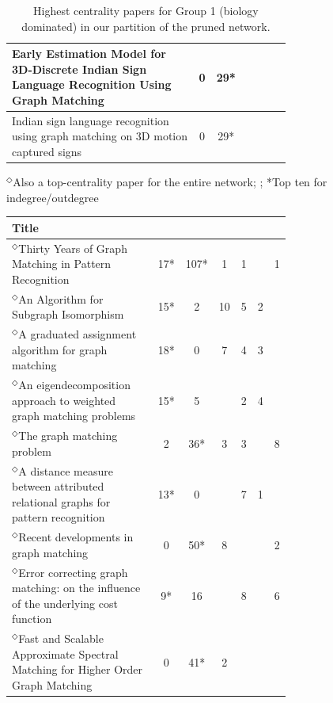 \documentclass[12pt]{thesis}
\theoremstyle{plain}
\theoremstyle{definition}
\theoremstyle{remark}
\begin{document}
\begin{table}[H]
{\begin{tabular}{|L{0.7\linewidth}|c|c|c|c|c|c|}
Early Estimation Model for 3D-Discrete Indian Sign Language Recognition Using Graph Matching  \cite{Kumar_2018a} & 0 & 29* &  &  &  &  \\ \hline
Indian sign language recognition using graph matching on 3D motion captured signs  \cite{Kumar_2018b} & 0 & 29* &  &  &  &  \\ \hline
\end{tabular}
\singlespacing
$^\Diamond$Also a top-centrality paper for the entire network; ; *Top ten for indegree/outdegree}
\caption{Highest centrality papers for Group 1 (biology dominated) in our partition of the pruned network.}
\label{tab:toppapers_bio}
\end{table}

\begin{table}[H]
{\fontsize{10}{13}\selectfont
\begin{tabular}{|L{0.7\linewidth}|c|c|c|c|c|c|}
\hline
Title &  &   &  &   &   &  \\ \hline\hline
$^\Diamond$Thirty Years of Graph Matching in Pattern Recognition  \cite{Conte_2004} & 17* & 107* & 1 & 1 &  & 1 \\ \hline
$^\Diamond$An Algorithm for Subgraph Isomorphism  \cite{Ullmann_1976} & 15* & 2 & 10 & 5 & 2 &  \\ \hline
$^\Diamond$A graduated assignment algorithm for graph matching  \cite{Gold_1996} & 18* & 0 & 7 & 4 & 3 &  \\ \hline
$^\Diamond$An eigendecomposition approach to weighted graph matching problems  \cite{Umeyama_1988} & 15* & 5 &  & 2 & 4 &  \\ \hline
$^\Diamond$The graph matching problem  \cite{Livi_2012} & 2 & 36* & 3 & 3 &  & 8 \\ \hline
$^\Diamond$A distance measure between attributed relational graphs for pattern recognition  \cite{Sanfeliu_1983} & 13* & 0 &  & 7 & 1 &  \\ \hline
$^\Diamond$Recent developments in graph matching  \cite{Bunke_2000} & 0 & 50* & 8 &  &  & 2 \\ \hline
$^\Diamond$Error correcting graph matching: on the influence of the underlying cost function  \cite{Bunke_1999} & 9* & 16 &  & 8 &  & 6 \\ \hline
$^\Diamond$Fast and Scalable Approximate Spectral Matching for Higher Order Graph Matching  \cite{Park_2014} & 0 & 41* & 2 &  &  &  \\ \hline

\end{tabular}}
\end{table}
\end{document}
